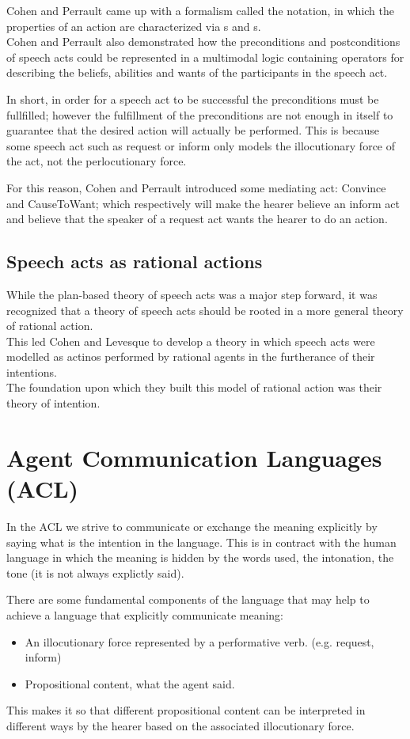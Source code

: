 Cohen and Perrault came up with a formalism called the  notation, in which the properties of an action are characterized via s and s.\\
Cohen and Perrault also demonstrated how the preconditions and postconditions of speech acts could be represented in a multimodal logic containing operators for describing the beliefs, abilities and wants of the participants in the speech act.

In short, in order for a speech act to be successful the preconditions must be fullfilled; however the fulfillment of the preconditions are not enough in itself to guarantee that the desired action will actually be performed. This is because some speech act such as request or inform only models the illocutionary force of the act, not the perlocutionary force.

For this reason, Cohen and Perrault introduced some mediating act: Convince and CauseToWant; which respectively will make the hearer believe an inform act and believe that the speaker of a request act wants the hearer to do an action.

\subsection{Speech acts as rational actions}
While the plan-based theory of speech acts was a major step forward, it was recognized that a theory of speech acts should be rooted in a more general theory of rational action.\\
This led Cohen and Levesque to develop a theory in which speech acts were modelled as actinos performed by rational agents in the furtherance of their intentions.\\
The foundation upon which they built this model of rational action was their theory of intention.

\section{Agent Communication Languages (ACL)}
In the ACL we strive to communicate or exchange the meaning explicitly by saying what is the intention in the language. This is in contract with the human language in which the meaning is hidden by the words used, the intonation, the tone (it is not always explictly said).

There are some fundamental components of the language that may help to achieve a language that explicitly communicate meaning:
\begin{itemize}
\item An illocutionary force represented by a performative verb. (e.g. request, inform)
\item Propositional content, what the agent said.
\end{itemize}
This makes it so that different propositional content can be interpreted in different ways by the hearer based on the associated illocutionary force.

